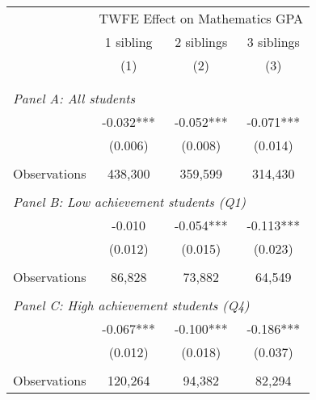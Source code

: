 \makeatletter
{}
{
\makeatother
\begin{tabular}{lccc}
\toprule
\cmidrule(lr){2-4}
& \multicolumn{3}{c}{TWFE Effect on Mathematics GPA} \\
\cmidrule(lr){2-4}
& 1 sibling & 2 siblings & 3 siblings  \\
\cmidrule(lr){2-2} \cmidrule(lr){3-3} \cmidrule(lr){4-4}
& (1) & (2) & (3)\\
\bottomrule
&  &  &  \\
&  &  &   \\
\multicolumn{4}{l}{\textit{Panel A: All students}} \\
\hspace{3mm}        &      -0.032***&      -0.052***&      -0.071***\\
                    &     (0.006)   &     (0.008)   &     (0.014)   \\
                    &               &               &               \\
\hspace{3mm}Observations&     438,300   &     359,599   &     314,430   \\
 
&  &  &   \\
\multicolumn{4}{l}{\textit{Panel B: Low achievement students (Q1)}} \\
\hspace{3mm}        &      -0.010   &      -0.054***&      -0.113***\\
                    &     (0.012)   &     (0.015)   &     (0.023)   \\
                    &               &               &               \\
\hspace{3mm}Observations&      86,828   &      73,882   &      64,549   \\
 
&  &  &   \\
\multicolumn{4}{l}{\textit{Panel C: High achievement students (Q4)}} \\
\hspace{3mm}        &      -0.067***&      -0.100***&      -0.186***\\
                    &     (0.012)   &     (0.018)   &     (0.037)   \\
                    &               &               &               \\
\hspace{3mm}Observations&     120,264   &      94,382   &      82,294   \\
 

\end{tabular}}
